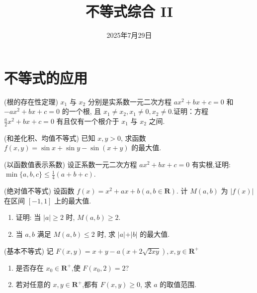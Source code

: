 \documentclass[a4paper , final]{ctexart}
\title{不等式综合 II}
\date{2025年7月29日}
\newenvironment{problem}[1]{%
  \item #1
  \par
  \vspace{8cm}
}{}
\begin{document}
\maketitle


\section*{不等式的应用}

\begin{problems}
  \begin{problem}
  {(根的存在性定理)
  $x_1$ 与 $x_2$ 分别是实系数一元二次方程 $ax^2 + bx + c = 0$ 和 $-ax^2 + bx + c = 0$ 的一个根, 且 $x_1 \ne x_2, x_1 \ne 0, x_2 \ne 0$.证明：方程 $\frac{a}{2}x^2 + bx + c = 0$ 有且仅有一个根介于 $x_1$ 与 $x_2$ 之间.
  }
  \end{problem}

  \begin{problem}
  {(和差化积、均值不等式)
  已知 $x, y > 0$, 求函数 $f(x,y) = \sin x + \sin y - \sin(x+y)$ 的最大值.
  }
  \end{problem}

  \begin{problem}
  {(以函数值表示系数)
  设正系数一元二次方程 $ax^2 + bx + c = 0$ 有实根,证明: $\min\{a,b,c\}\leq\frac{1}{4}(a+b+c)$.
  }
  \end{problem}

  \begin{problem}
  {(绝对值不等式)
  设函数 $f(x) = x^2+ax+b(a,b\in\mathbf{R})$. 计 $M(a,b)$ 为 $\vert f(x)\vert$ 在区间 $[-1,1]$ 上的最大值.
  \begin{enumerate}[label=(\arabic*)]
    \item 证明: 当 $\vert a\vert\ge 2$ 时, $M(a,b) \geq 2$.
    \item 当 $a,b$ 满足 $M(a,b)\leq 2$ 时, 求 $\vert a\vert + \vert b\vert$ 的最大值.
  \end{enumerate}
  }
  \end{problem}

  \newpage
  \begin{problem}
  {(基本不等式)
  记 $F(x,y)=x+y-a(x+2\sqrt{2xy}),x,y\in\mathbf{R}^+$
  \begin{enumerate}[label=(\arabic*)]
    \item 是否存在 $x_0\in\mathbf{R}^+$,使 $F(x_0,2)=2$?
    \item 若对任意的 $x,y\in\mathbf{R}^+$,都有 $F(x,y)\geq 0$, 求 $a$ 的取值范围.
  \end{enumerate}
  }
  \end{problem}


\end{problems}
\end{document}
